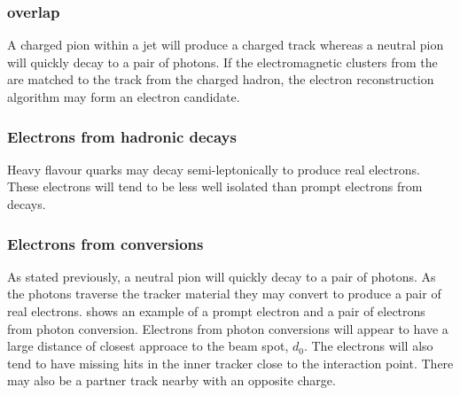 \subsubsection{\HepProcess{\Ppipm \Ppizero} overlap}
A charged pion within a jet will produce a charged track whereas a neutral pion
will quickly decay to a pair of photons. If the electromagnetic clusters from
the \Ppizero are matched to the track from the charged hadron, the electron
reconstruction algorithm may form an electron candidate\cite{nikos}.

\subsubsection{Electrons from hadronic decays}
Heavy flavour quarks may decay semi-leptonically to produce real electrons. These
electrons will tend to be less well isolated than prompt electrons from \PW
decays\cite{nikos}.

\subsubsection{Electrons from conversions}
As stated previously, a neutral pion will quickly decay to a pair of photons. As
the photons traverse the tracker material they may convert to produce a pair of
real electrons\cite{nikos,barge2009conversion}.  
shows an example of a prompt electron and a pair of electrons from photon
conversion.  Electrons from photon conversions will appear to have a large
distance of closest approace to the beam spot, $d_0$.  The electrons will also
tend to have missing hits in the inner tracker close to the interaction point.
There may also be a partner track nearby with an opposite charge.

